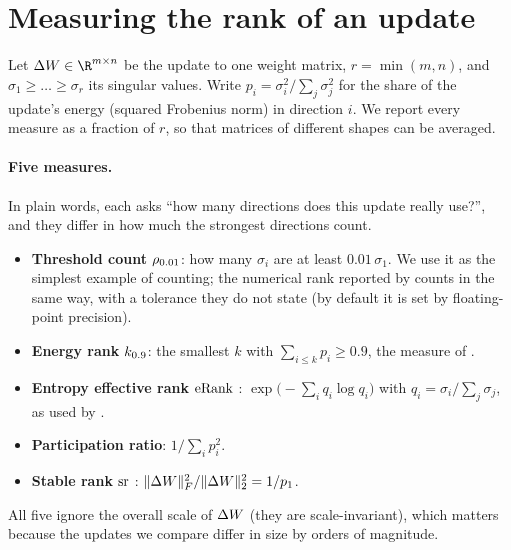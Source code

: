 \section{Measuring the rank of an update}
\label{sec:background}

Let $\dW \in \R^{m\times n}$ be the update to one weight matrix,
$r = \min(m,n)$, and $\sigma_1 \geq \dots \geq \sigma_r$ its singular values.
Write $p_i = \sigma_i^2 / \sum_j \sigma_j^2$ for the share of the update's
energy (squared Frobenius norm) in direction $i$. We report every measure as a
fraction of $r$, so that matrices of different shapes can be averaged.

\paragraph{Five measures.} In plain words, each asks ``how many directions
does this update really use?'', and they differ in how much the strongest
directions count.
\begin{itemize}
  \item \textbf{Threshold count} $\rho_{0.01}$: how many $\sigma_i$ are at
  least $0.01\,\sigma_1$. We use it as the simplest example of counting; the
  numerical rank reported by \citet{mukherjee2025rl} counts in the same way,
  with a tolerance they do not state (by default it is set by floating-point
  precision).
  \item \textbf{Energy rank} $k_{0.9}$: the smallest $k$ with
  $\sum_{i\leq k} p_i \geq 0.9$, the measure of \citet{biderman2024lora}.
  \item \textbf{Entropy effective rank} $\mathrm{eRank}$
  \citep{roy2007effective}: $\exp\bigl(-\sum_i q_i \log q_i\bigr)$ with
  $q_i = \sigma_i/\sum_j \sigma_j$, as used by \citet{wu2025timber}.
  \item \textbf{Participation ratio}: $1/\sum_i p_i^2$.
  \item \textbf{Stable rank} $\mathrm{sr}$ \citep{rudelson2007sampling}:
  $\|\Delta W\|_F^2/\|\Delta W\|_2^2 = 1/p_1$.
\end{itemize}
All five ignore the overall scale of $\Delta W$ (they are scale-invariant), which matters because the updates
we compare differ in size by orders of magnitude.

